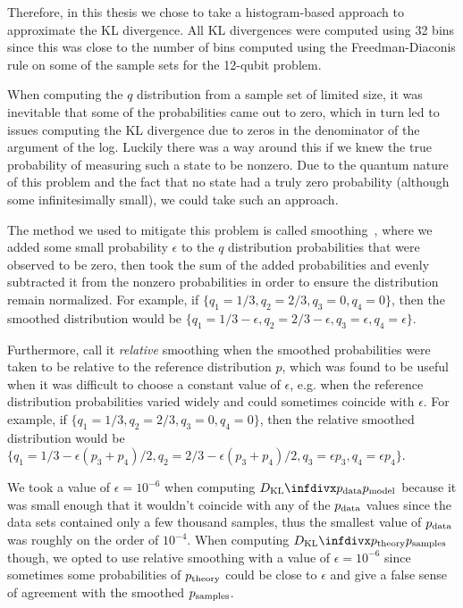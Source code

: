 Therefore, in this thesis we chose to take a histogram-based approach to approximate the KL divergence.
All KL divergences were computed using 32 bins since this was close to the number of bins computed using the Freedman-Diaconis rule on some of the sample sets for the 12-qubit problem.

When computing the \( q \) distribution from a sample set of limited size, it was inevitable that some of the probabilities came out to zero, which in turn led to issues computing the KL divergence due to zeros in the denominator of the argument of the log.
Luckily there was a way around this if we knew the true probability of measuring such a state to be nonzero.
Due to the quantum nature of this problem and the fact that no state had a truly zero probability (although some infinitesimally small), we could take such an approach.

The method we used to mitigate this problem is called smoothing~\cite{han_kl_divergence}, where we added some small probability \( \epsilon \) to the \( q \) distribution probabilities that were observed to be zero, then took the sum of the added probabilities and evenly subtracted it from the nonzero probabilities in order to ensure the distribution remain normalized.
For example, if \( \{q_1 = 1/3, q_2 = 2/3, q_3 = 0, q_4 = 0\} \), then the smoothed distribution would be \( \{q_1 = 1/3 - \epsilon, q_2 = 2/3 - \epsilon, q_3 = \epsilon, q_4 = \epsilon\} \).

Furthermore, call it \textit{relative} smoothing when the smoothed probabilities were taken to be relative to the reference distribution \( p \), which was found to be useful when it was difficult to choose a constant value of \( \epsilon \), e.g. when the reference distribution probabilities varied widely and could sometimes coincide with \( \epsilon \).
For example, if \( \{q_1 = 1/3, q_2 = 2/3, q_3 = 0, q_4 = 0\} \), then the relative smoothed distribution would be \( \{q_1 = 1/3 - \epsilon (p_3 + p_4)/2, q_2 = 2/3 - \epsilon (p_3 + p_4)/2, q_3 = \epsilon p_3, q_4 = \epsilon p_4\} \).

We took a value of \( \epsilon = 10^{-6} \) when computing \( \DKL{\pdata}{\pmodel} \) because it was small enough that it wouldn't coincide with any of the \( p_{\text{data}} \) values since the data sets contained only a few thousand samples, thus the smallest value of \( p_{\text{data}} \) was roughly on the order of \( 10^{-4} \).
When computing \( \DKL{\ptheory}{\psamples} \) though, we opted to use relative smoothing with a value of \( \epsilon = 10^{-6} \) since sometimes some probabilities of \( p_{\text{theory}} \) could be close to \( \epsilon \) and give a false sense of agreement with the smoothed \( p_{\text{samples}} \).

